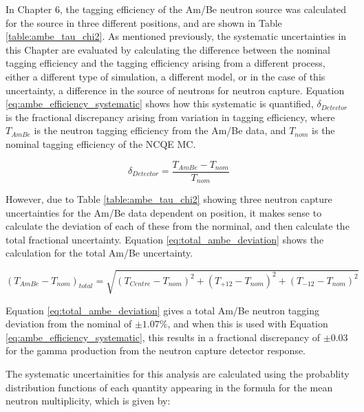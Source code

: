 In Chapter 6, the tagging efficiency of the Am/Be neutron source was calculated for the source in three different positions, and are shown in Table \ref{table:ambe_tau_chi2}. As mentioned previously, the systematic uncertainties in this Chapter are evaluated by calculating the difference between the nominal tagging efficiency and the tagging efficiency arising from a different process, either a different type of simulation, a different model, or in the case of this uncertainty, a difference in the source of neutrons for neutron capture. Equation \ref{eq:ambe_efficiency_systematic} shows how this systematic is quantified, $\delta_{Detector}$ is the fractional discrepancy arising from variation in tagging efficiency, where $T_{AmBe}$ is the neutron tagging efficiency from the Am/Be data, and $T_{nom}$ is the nominal tagging efficiency of the NCQE MC. 

\begin{equation}
\delta_{Detector}=\frac{T_{AmBe}-T_{n o m}}{T_{n o m}}
\label{eq:ambe_efficiency_systematic}
\end{equation}

However, due to Table \ref{table:ambe_tau_chi2} showing three neutron capture uncertainties for the Am/Be data dependent on position, it makes sense to calculate the deviation of each of these from the norminal, and then calculate the total fractional uncertainty. Equation \ref{eq:total_ambe_deviation} shows the calculation for the total Am/Be uncertainty.

\begin{equation}
    (T_{AmBe}-T_{n o m})_{total} = \sqrt{(T_{Centre} - T_{nom})^{2} + (T_{+12} - T_{nom})^{2} +(T_{-12} - T_{nom})^{2}}
\label{eq:total_ambe_deviation}
\end{equation}

Equation \ref{eq:total_ambe_deviation} gives a total Am/Be neutron tagging deviation from the nominal of $\pm 1.07$\%, and when this is used with Equation \ref{eq:ambe_efficiency_systematic}, this results in a fractional discrepancy of $\pm 0.03$ for the gamma production from the neutron capture detector response.













The systematic uncertainities for this analysis are calculated using the probablity distribution functions of each quantity appearing in the formula for the mean neutron multiplicity, which is given by:

